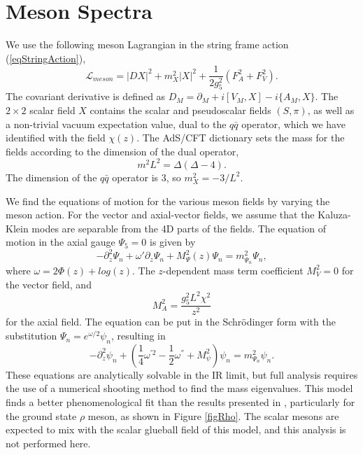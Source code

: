 \documentclass[aps,prd,12pt,nofootinbib]{revtex4}
\newcommand{\be}{\begin{equation}}
\newcommand{\ee}{\end{equation}}
\def\thalf{{\textstyle{\frac{1}{2}}}}
\def\oneqt{{\textstyle{\frac{1}{4}}}}
\newcommand{\cL}{\mathcal L}
\begin{document}
\section{Meson Spectra}

We use the following meson Lagrangian in the string frame action (\ref{eqStringAction}),
\be
\cL_{meson}=\left|DX\right|^2+m_X^2\left|X\right|^2 +\frac{1}{2g_5^2}\left(F_A^2 +F_V^2\right).
\label{eqMesonL}
\ee
The covariant derivative is defined as $D_M = \partial_M+i[V_M,X]-i\{A_M,X\}$. 
The $2 \times 2$ scalar  field $X$ contains the scalar and pseudoscalar fields $(S,\pi)$, as well as a non-trivial vacuum expectation value, dual to the $q\bar{q}$ operator, which we have identified with the field $\chi(z)$.
The AdS/CFT dictionary sets the mass for the fields according to the dimension of the dual operator,
\be
m^2L^2=\Delta(\Delta-4).
\ee
The dimension of the $q\bar{q}$ operator is 3, so $m_X^2 = -3/L^2$.

We find the equations of motion for the various meson fields by varying the meson action.
For the vector and axial-vector fields, we  assume that the Kaluza-Klein modes are separable from the 4D parts of the fields.
The equation of motion in the axial gauge $\Psi_5=0$  is given by
\be
-\partial_z^2\Psi_n+\omega'\partial_z\Psi_n +M_\Psi^2(z) \Psi_n=m^2_{\Psi_n}\Psi_n,
\ee
where $\omega=2\Phi(z)+log(z)$. 
The $z$-dependent mass term coefficient $M^2_V=0$  for the vector field, and 
\be
M^2_A=\frac{g_5^2L^2\chi^2}{z^2}
\ee
for the axial field.
The equation can be put in the Schr{\"o}dinger form with the substitution $\Psi_n=e^{\omega/2}\psi_n$, resulting in
\be
-\partial^2_z\psi_n+\left(\oneqt \omega^{'2}-\thalf\omega^{''}+M_\psi^2\right)\psi_n=m^2_{\Psi_n}\psi_n.
\ee
These equations are analytically solvable in the IR limit, but full analysis requires the use of a numerical shooting method to find the mass eigenvalues.
This model finds a better phenomenological fit than the results presented in \cite{gherghetta-kelley}, particularly for the ground state $\rho$ meson, as shown in Figure \ref{figRho}. 
The scalar mesons are expected to mix with the scalar glueball field of this model, and this analysis is not performed here. 
\end{document}
